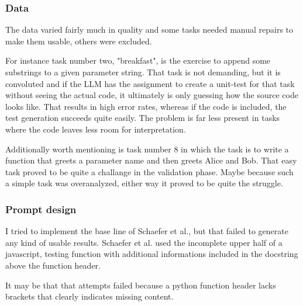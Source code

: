 \documentclass[a4paper,11pt,oneside]{memoir}
\begin{document}
\subsubsection{Data}
\label{Challanges:Data}

The data varied fairly much in quality and some tasks needed manual repairs to make them usable, others were excluded. 

For instance task number two, "breakfast", is the exercise to append some substrings to a given parameter string. That task is not demanding, but it is convoluted and if the LLM has the assignment to create a unit-test for that task without seeing the actual code, it ultimately is only guessing how the source code looks like. That results in high error rates, whereas if the code is included, the test generation succeeds quite easily.
The problem is far less present in tasks where the code leaves less room for interpretation.

Additionally worth mentioning is task number 8 in which the task is to write a function that greets a parameter name and then greets Alice and Bob. That easy task proved to be quite a challange in the validation phase. Maybe because such a simple task was overanalyzed, either way it proved to be quite the struggle.

\subsubsection{Prompt design}
I tried to implement the base line of Schaefer et al.\cite{Schaefer_automated_unit_test_generation}, but that failed to generate any kind of usable results. Schaefer et al. used the incomplete upper half of a javascript, testing function with additional informations included in the docstring above the function header. 

It may be that that attempts failed because a python function header lacks brackets that clearly indicates missing content. 
\end{document}
